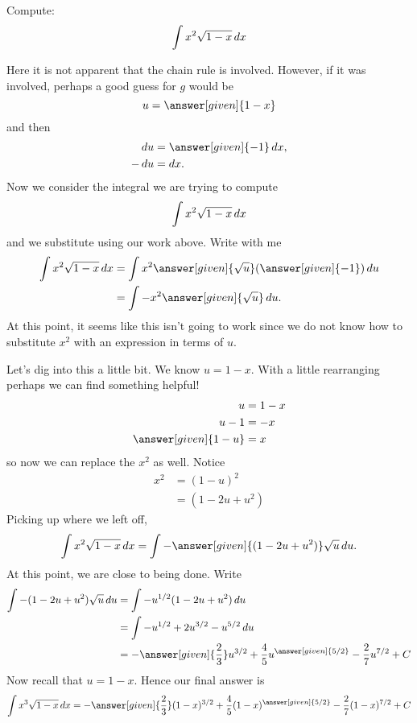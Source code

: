 \documentclass{ximera}
\begin{document}
\begin{example}
  Compute:
\[
\int x^2\sqrt{1-x}\mathop{}\!d x
\]
\begin{explanation}

Here it is not apparent that the chain rule is involved. However, if
it was involved, perhaps a good guess for $g$ would be
\[
u = \answer[given]{1-x}
\]
and then
\begin{align*}
  \d u &= \answer[given]{-1} \d x, \\
  -\d u &= \d x.
\end{align*}
Now we consider the integral we are trying to compute
\[
\int x^2\sqrt{1-x}\mathop{}\!d x
\]
and we substitute using our work above. Write with me
\begin{align*}
  \int x^2\sqrt{1-x}\d x &= \int x^2 \answer[given]{\sqrt{u}} ( \answer[given]{-1} ) \d u \\
  &= \int {-x^2 \answer[given]{\sqrt{u}}}\d u.
\end{align*}
At this point, it seems like this isn't going to work since we do not know how to substitute $x^2$ with an expression in terms of $u$.

Let's dig into this a little bit. We know $u=1-x$. With a little rearranging perhaps we can find something helpful!
\begin{align*}
u &= 1-x \\
 u -1 &= -x\\
 \answer[given]{1- u} &= x
\end{align*}
so now we can replace the $x^2$ as well. Notice 
\begin{align*}
    x^2&=(1-u)^2\\
    &=(1-2u+u^2)
\end{align*}
Picking up where we left off, 
\[ \int x^2\sqrt{1-x}\d x = \int -\answer[given]{(1-2u+u^2)} \sqrt{u}\d u.
\]
At this point, we are close to being done. Write
\begin{align*}
\int -{(1-2u+u^2)} \sqrt{u}\d u &= \int -u^{1/2}{(1-2u+u^2)} \d u\\
&=\int -u^{1/2}+2u^{3/2}-u^{5/2}\d u\\
&=-\answer[given]{\frac{2}{3}}u^{3/2}+\frac{4}{5}u^{\answer[given]{5/2}}-\frac{2}{7}u^{7/2}+C
\end{align*}
Now recall that $u = 1-x$. Hence our final answer is
\[
\int x^3\sqrt{1-x}\d x = -\answer[given]{\frac{2}{3}}(1-x)^{3/2}+\frac{4}{5}(1-x)^{\answer[given]{5/2}}-\frac{2}{7}(1-x)^{7/2}+C
\]
\end{explanation}
\end{example}
\end{document}

